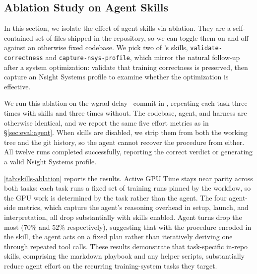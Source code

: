 \subsection{Ablation Study on Agent Skills}
\label{sec:eval:skills-ablation}



In this section, we isolate the effect of agent skills via
ablation. They are a self-contained set of files shipped in the
repository, so we can toggle them on and off against an otherwise
fixed codebase. We
pick two of
\sys's skills, \texttt{validate-correctness} and
\texttt{capture-nsys-profile}, which mirror the natural follow-up
after a system optimization: validate that training correctness is
preserved, then capture an Nsight Systems profile to examine
whether the optimization is effective.

We run this ablation on the wgrad delay~\cite{qi2024zero} commit in
\sys, repeating each task three times with skills and three times
without. The codebase, agent, and harness are otherwise identical,
and we report the same five effort metrics as in
\S\ref{sec:eval:agent}. When skills are disabled, we strip them
from both the working tree and the git history, so the agent cannot
recover the procedure from either. All twelve runs completed
successfully, reporting the correct verdict or generating a valid
Nsight Systems profile.

\autoref{tab:skills-ablation} reports the results. Active GPU
Time stays near parity across both tasks: each task runs a fixed
set of training runs pinned by the workflow, so the GPU work is
determined by the task rather than the agent. The four agent-side
metrics, which capture the agent's reasoning overhead in setup,
launch, and interpretation, all drop substantially with skills
enabled. Agent turns drop the most (70\% and 52\% respectively),
suggesting that with the procedure encoded in the skill, the agent
acts on a fixed plan rather than iteratively deriving one through
repeated tool calls. These results demonstrate that task-specific
in-repo skills, comprising the markdown playbook and any helper
scripts, substantially reduce agent effort on the recurring
training-system tasks they target.





